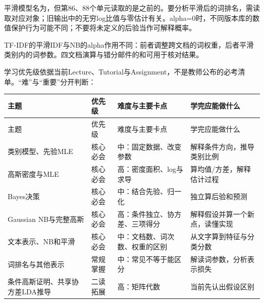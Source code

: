 平滑模型名为，但第86、88个单元读取的是之前的。要分析平滑后的词排名，需读取对应对象；旧输出中的无穷log比值与零估计有关。alpha=0时，不同版本库的数值保护行为可能不同；不要将未定义的后验当作可解释概率。


TF-IDF的平滑IDF与NB的alpha作用不同：前者调整跨文档的词权重，后者平滑类别内的词参数。四文档演算与错分邮件的和可用于核对结果。








学习优先级依据当前Lecture、Tutorial与Assignment，不是教师公布的必考清单。“难”与“重要”分开判断：


\begingroup
\small\setlength{\tabcolsep}{3pt}
\renewcommand{\arraystretch}{1.22}
\begin{longtable}{@{}>{\raggedright\arraybackslash}p{}>{\raggedright\arraybackslash}p{}>{\raggedright\arraybackslash}p{}>{\raggedright\arraybackslash}p{}@{}}
\toprule
主题 & 优先级 & 难度与主要卡点 & 学完应能做什么 \\
\midrule\endfirsthead
主题 & 优先级 & 难度与主要卡点 & 学完应能做什么 \\
\midrule\endhead
\bottomrule\endfoot
类别模型、先验MLE & 核心必会 & 中：固定数据、改变参数 & 解释条件方向，推导类别比例 \\
高斯密度与MLE & 核心必会 & 高：密度面积、log与求导 & 算均值/方差，解释估计过程 \\
Bayes决策 & 核心必会 & 中：结合先验、归一化 & 独立算后验和预测 \\
Gaussian NB与完整高斯 & 核心必会 & 高：条件独立、协方差、三项得分 & 解释假设并算一个新点，读懂实现 \\
文本表示、NB和平滑 & 核心必会 & 中：文档数、词次数、权重的区别 & 从文字算到特征与分类分数 \\
词排名与其他表示 & 常规掌握 & 中：常见不等于能区分 & 解读词参数，分析表示损失 \\
条件高斯证明、共享协方差LDA推导 & 二读拓展 & 高：矩阵代数 & 当前先认出假设区别 \\
\end{longtable}
\endgroup


